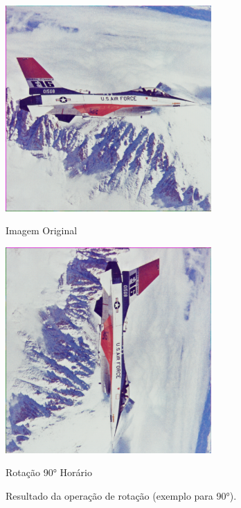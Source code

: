 \documentclass[a4paper, 11pt, portuguese]{article}
\begin{document}
\begin{figure}[htbp]
\centering
\begin{minipage}{0.48\textwidth}
    \centering
    \includegraphics[width=0.7\textwidth]{imagens/airplane.png} %
    \caption*{Imagem Original}
\end{minipage}
\hfill
\begin{minipage}{0.48\textwidth}
    \centering
    \includegraphics[width=0.7\textwidth]{imagens/airplane_rotated90.png} %
    \caption*{Rotação 90° Horário}
\end{minipage}
\caption{Resultado da operação de rotação (exemplo para 90°).}
\label{fig:rotacao}
\end{figure}
\end{document}
